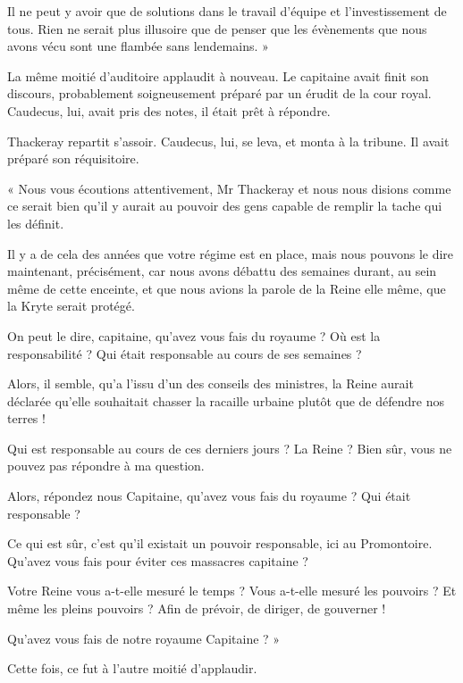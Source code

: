 \documentclass{book}
\begin{document}
Il ne peut y avoir que de solutions dans le travail d'équipe et l'investissement de tous. Rien ne serait plus illusoire que de penser que les évènements que nous avons vécu sont une flambée sans lendemains. »\newline

La même moitié d'auditoire applaudit à nouveau. Le capitaine avait finit son discours, probablement soigneusement préparé par un érudit de la cour royal. Caudecus, lui, avait pris des notes, il était prêt à répondre.\newline

Thackeray repartit s'assoir. Caudecus, lui, se leva, et monta à la tribune. Il avait préparé son réquisitoire.\newline

« Nous vous écoutions attentivement, Mr Thackeray et nous nous disions comme ce serait bien qu'il y aurait au pouvoir des gens capable de remplir la tache qui les définit.

Il y a de cela des années que votre régime est en place, mais nous pouvons le dire maintenant, précisément, car nous avons débattu des semaines durant, au sein même de cette enceinte, et que nous avions la parole de la Reine elle même, que la Kryte serait protégé.

On peut le dire, capitaine, qu'avez vous fais du royaume ? Où est la responsabilité ? Qui était responsable au cours de ses semaines ?

Alors, il semble, qu'a l'issu d'un des conseils des ministres, la Reine aurait déclarée qu'elle souhaitait chasser la racaille urbaine plutôt que de défendre nos terres !

Qui est responsable au cours de ces derniers jours ? La Reine ? Bien sûr, vous ne pouvez pas répondre à ma question.

Alors, répondez nous Capitaine, qu'avez vous fais du royaume ? Qui était responsable ?

Ce qui est sûr, c'est qu'il existait un pouvoir responsable, ici au Promontoire. Qu'avez vous fais pour éviter ces massacres capitaine ?

Votre Reine vous a-t-elle mesuré le temps ? Vous a-t-elle mesuré les pouvoirs ? Et même les pleins pouvoirs ? Afin de prévoir, de diriger, de gouverner !

Qu'avez vous fais de notre royaume Capitaine ?  »\newline

Cette fois, ce fut à l'autre moitié d'applaudir.\newline
\end{document}
